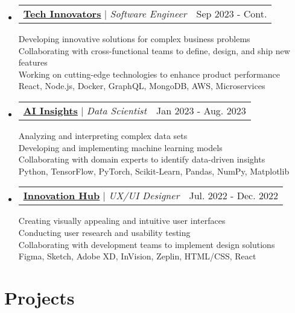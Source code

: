 \documentclass[letterpaper,11pt]{article}%
\makeatletter
\newcommand{\resumeProjectHeading}[2]{
    \item
    \begin{tabular*}{0.97\textwidth}{l@{\extracolsep{\fill}}r}
      \small#1 & #2 \\
    \end{tabular*}\vspace{-7pt}
}
\newcommand{\resumeSubHeadingListStart}{\begin{itemize}[leftmargin=0.15in, label={}]}
\newcommand{\resumeSubHeadingListEnd}{\end{itemize}}
\makeatother
\begin{document}
%
\resumeSubHeadingListStart%
\resumeProjectHeading{\textbf{\href{https://techinnovators.com/}{\underline{Tech Innovators}}} $|$ \footnotesize\emph{Software Engineer}\vspace{8pt}}{Sep 2023 - Cont.}{\small{Developing innovative solutions for complex business problems}}\\
{\small{Collaborating with cross-functional teams to define, design, and ship new features}}\\
{\small{Working on cutting-edge technologies to enhance product performance}}\\
{\small{React, Node.js, Docker, GraphQL, MongoDB, AWS, Microservices}}%
\resumeProjectHeading{\textbf{\href{https://aiinsights.com/}{\underline{AI Insights}}} $|$ \footnotesize\emph{Data Scientist}\vspace{8pt}}{Jan 2023 - Aug. 2023}{\small{Analyzing and interpreting complex data sets}}\\
{\small{Developing and implementing machine learning models}}\\
{\small{Collaborating with domain experts to identify data-driven insights}}\\
{\small{Python, TensorFlow, PyTorch, Scikit-Learn, Pandas, NumPy, Matplotlib}}%
\resumeProjectHeading{\textbf{\href{None}{\underline{Innovation Hub}}} $|$ \footnotesize\emph{UX/UI Designer}\vspace{8pt}}{Jul. 2022 - Dec. 2022}{\small{Creating visually appealing and intuitive user interfaces}}\\
{\small{Conducting user research and usability testing}}\\
{\small{Collaborating with development teams to implement design solutions}}\\
{\small{Figma, Sketch, Adobe XD, InVision, Zeplin, HTML/CSS, React}}%
\resumeSubHeadingListEnd%
\section{Projects}%
\label{sec:Projects}%
\end{document}
